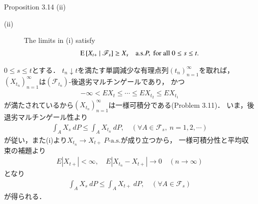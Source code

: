	\begin{itembox}[l]{Proposition 3.14 (ii)}
		\begin{description}
			\item[(ii)] The limits in (i) satisfy
			\begin{align}
				\operatorname{E} \left[ X_{t+} \ \middle|\ \mathscr{F}_s \right] \geq X_s \quad \mbox{a.s.} P,\ \mbox{for all } 0 \leq s \leq t.
			\end{align}
		\end{description}
	\end{itembox}
	
	\begin{prf}
		$0 \leq s \leq t$とする．
		$t_n \downarrow t$を満たす単調減少な有理点列$(t_n)_{n=1}^\infty$を取れば，
		$\left( X_{t_n} \right)_{n=1}^\infty$は$(\mathscr{F}_{t_n})$-後退劣マルチンゲールであり，
		かつ
		\begin{align}
			-\infty < EX_t \leq  \cdots \leq EX_{t_2} \leq EX_{t_1}
		\end{align}
		が満たされているから$(X_{t_n})_{n=1}^\infty$は一様可積分である(Problem 3.11)．
		いま，後退劣マルチンゲール性より
		\begin{align}
			\int_A X_s\ dP \leq \int_A X_{t_n}\ dP,
			\quad (\forall A \in \mathscr{F}_s,\ n=1,2,\cdots)
		\end{align}
		が従い，また(i)より$X_{t_n} \longrightarrow X_{t+}\ \mbox{$P$-a.s.}$が成り立つから，
		一様可積分性と平均収束の補題より
		\begin{align}
			E\left| X_{t+} \right| < \infty,
			\quad E \left| X_{t_n} - X_{t+} \right| \longrightarrow 0
			\quad (n \longrightarrow \infty)
			\label{eq:chapter_1_Proposition_3_14_1}
		\end{align}
		となり
		\begin{align}
			\int_A X_s\ dP \leq \int_A X_{t+}\ dP,
			\quad (\forall A \in \mathscr{F}_s)
		\end{align}
		が得られる．
		\QED
	\end{prf}
	
